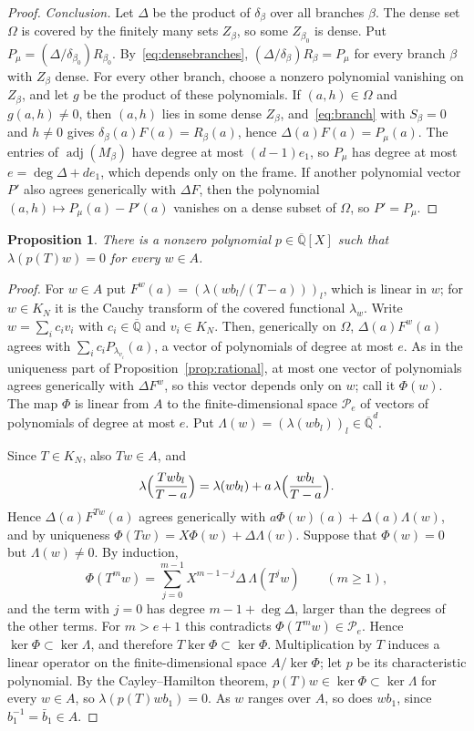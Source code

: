 \documentclass[10pt]{article}
\newtheorem{prop}[thm]{Proposition}
\theoremstyle{remark}
\newcommand{\Qbar}{\overline{\mathbb Q}}
\DeclareMathOperator{\adj}{adj}
\begin{document}
\begin{proof}
\emph{Conclusion.} Let $\Delta$ be the product of $\delta_\beta$ over all branches $\beta$. The dense set $\Omega$ is covered by the finitely many sets $Z_\beta$, so some $Z_{\beta_0}$ is dense. Put $P_\mu=(\Delta/\delta_{\beta_0})R_{\beta_0}$. By~\eqref{eq:densebranches}, $(\Delta/\delta_\beta)R_\beta=P_\mu$ for every branch $\beta$ with $Z_\beta$ dense. For every other branch, choose a nonzero polynomial vanishing on $Z_\beta$, and let $g$ be the product of these polynomials. If $(a,h)\in\Omega$ and $g(a,h)\ne0$, then $(a,h)$ lies in some dense $Z_\beta$, and~\eqref{eq:branch} with $S_\beta=0$ and $h\ne0$ gives $\delta_\beta(a)F(a)=R_\beta(a)$, hence $\Delta(a)F(a)=P_\mu(a)$. The entries of $\adj(M_\beta)$ have degree at most $(d-1)e_1$, so $P_\mu$ has degree at most $e=\deg\Delta+de_1$, which depends only on the frame. If another polynomial vector $P'$ also agrees generically with $\Delta F$, then the polynomial $(a,h)\mapsto P_\mu(a)-P'(a)$ vanishes on a dense subset of $\Omega$, so $P'=P_\mu$.
\end{proof}

\begin{prop}\label{prop:annihilator}
There is a nonzero polynomial $p\in\Qbar[X]$ such that $\lambda(p(T)w)=0$ for every $w\in A$.
\end{prop}

\begin{proof}
For $w\in A$ put $F^w(a)=(\lambda(wb_l/(T-a)))_l$, which is linear in $w$; for $w\in K_N$ it is the Cauchy transform of the covered functional $\lambda_w$. Write $w=\sum_ic_iv_i$ with $c_i\in\Qbar$ and $v_i\in K_N$. Then, generically on $\Omega$, $\Delta(a)F^w(a)$ agrees with $\sum_ic_iP_{\lambda_{v_i}}(a)$, a vector of polynomials of degree at most $e$. As in the uniqueness part of Proposition~\ref{prop:rational}, at most one vector of polynomials agrees generically with $\Delta F^w$, so this vector depends only on $w$; call it $\Phi(w)$. The map $\Phi$ is linear from $A$ to the finite-dimensional space $\mathcal P_e$ of vectors of polynomials of degree at most $e$. Put $\Lambda(w)=(\lambda(wb_l))_l\in\Qbar^d$.

Since $T\in K_N$, also $Tw\in A$, and
\[
 \lambda\Bigl(\frac{Twb_l}{T-a}\Bigr)=\lambda(wb_l)+a\,\lambda\Bigl(\frac{wb_l}{T-a}\Bigr).
\]
Hence $\Delta(a)F^{Tw}(a)$ agrees generically with $a\Phi(w)(a)+\Delta(a)\Lambda(w)$, and by uniqueness $\Phi(Tw)=X\Phi(w)+\Delta\Lambda(w)$. Suppose that $\Phi(w)=0$ but $\Lambda(w)\ne0$. By induction,
\[
 \Phi(T^mw)=\sum_{j=0}^{m-1}X^{m-1-j}\Delta\,\Lambda(T^jw)\qquad(m\ge1),
\]
and the term with $j=0$ has degree $m-1+\deg\Delta$, larger than the degrees of the other terms. For $m>e+1$ this contradicts $\Phi(T^mw)\in \mathcal P_e$. Hence $\ker\Phi\subset\ker\Lambda$, and therefore $T\ker\Phi\subset\ker\Phi$. Multiplication by $T$ induces a linear operator on the finite-dimensional space $A/\ker\Phi$; let $p$ be its characteristic polynomial. By the Cayley--Hamilton theorem, $p(T)w\in\ker\Phi\subset\ker\Lambda$ for every $w\in A$, so $\lambda(p(T)wb_1)=0$. As $w$ ranges over $A$, so does $wb_1$, since $b_1^{-1}=\bar b_1\in A$.
\end{proof}
\end{document}
